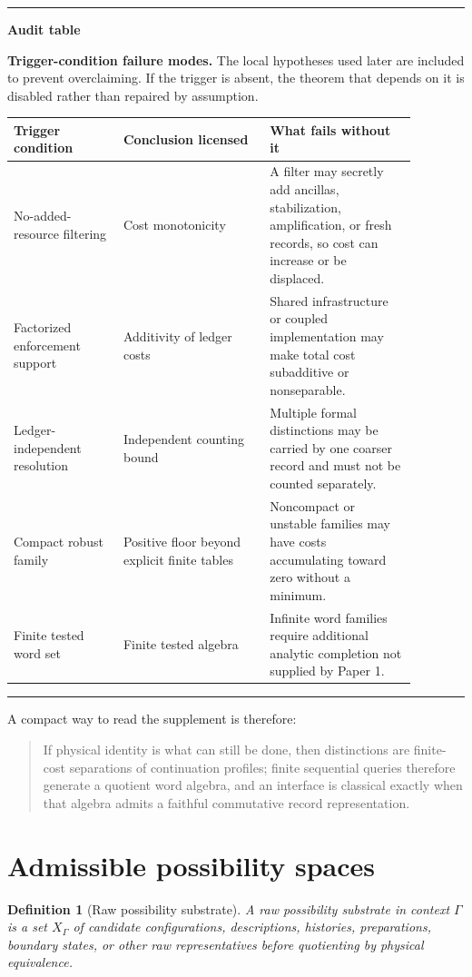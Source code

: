 \documentclass[11pt]{article}
\newtheorem{definition}[theorem]{Definition}
\newenvironment{auditbox}{\par\medskip\hrule\vspace{0.4em}\textbf{Audit table}\par\vspace{0.3em}}{\vspace{0.5em}\hrule\par\medskip}
\begin{document}
\begin{auditbox}
\textbf{Trigger-condition failure modes.}  The local hypotheses used later are included to prevent overclaiming.  If the trigger is absent, the theorem that depends on it is disabled rather than repaired by assumption.
\begin{center}
\scriptsize
\begin{tabular}{@{}p{0.24\linewidth}p{0.32\linewidth}p{0.32\linewidth}@{}}
\toprule
Trigger condition & Conclusion licensed & What fails without it \\
\midrule
No-added-resource filtering & Cost monotonicity & A filter may secretly add ancillas, stabilization, amplification, or fresh records, so cost can increase or be displaced. \\
Factorized enforcement support & Additivity of ledger costs & Shared infrastructure or coupled implementation may make total cost subadditive or nonseparable. \\
Ledger-independent resolution & Independent counting bound & Multiple formal distinctions may be carried by one coarser record and must not be counted separately. \\
Compact robust family & Positive floor beyond explicit finite tables & Noncompact or unstable families may have costs accumulating toward zero without a minimum. \\
Finite tested word set & Finite tested algebra & Infinite word families require additional analytic completion not supplied by Paper 1. \\
\bottomrule
\end{tabular}
\end{center}
\end{auditbox}

A compact way to read the supplement is therefore:
\begin{quote}
If physical identity is what can still be done, then distinctions are finite-cost separations of continuation profiles; finite sequential queries therefore generate a quotient word algebra, and an interface is classical exactly when that algebra admits a faithful commutative record representation.
\end{quote}

\section{Admissible possibility spaces}\label{sec:admissible-possibility-spaces}

\begin{definition}[Raw possibility substrate]
A \emph{raw possibility substrate} in context $\Gamma$ is a set $X_\Gamma$ of candidate configurations, descriptions, histories, preparations, boundary states, or other raw representatives before quotienting by physical equivalence.
\end{definition}
\end{document}
